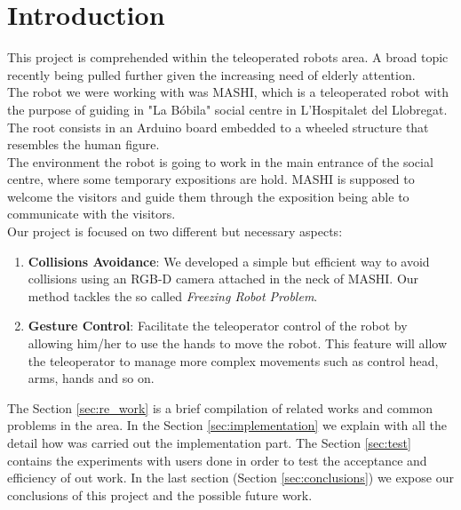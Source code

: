 \section{Introduction}
\label{sec:introduction}

This project is comprehended within the teleoperated robots area. A broad topic recently being pulled further given the increasing need of elderly attention.\\ 

The robot we were working with was MASHI, which is a teleoperated robot with the purpose of guiding in "La Bóbila" social centre in L'Hospitalet del Llobregat. The root consists in an Arduino board embedded to a wheeled structure that resembles the human figure.\\

The environment the robot is going to work in the main entrance of the social centre, where some temporary expositions are hold. MASHI is supposed to welcome the visitors and guide them through the exposition being able to communicate with the visitors.\\

Our project is focused on two different but necessary aspects:
\begin{enumerate}
	\item \textbf{Collisions Avoidance}: We developed a simple but efficient way to avoid collisions using an RGB-D camera attached in the neck of MASHI. Our method tackles the so called \emph{Freezing Robot Problem}.
	\item \textbf{Gesture Control}: Facilitate the teleoperator control of the robot by allowing him/her to use the hands to move the robot. This feature will allow the teleoperator to manage more complex movements such as control head, arms, hands and so on.
\end{enumerate}

The Section \ref{sec:re_work} is a brief compilation of related works and common problems in the area. In the Section \ref{sec:implementation} we explain with all the detail how was carried out the implementation part. The Section \ref{sec:test} contains the experiments with users done in order to test the acceptance and efficiency of out work. In the last section (Section \ref{sec:conclusions}) we expose our conclusions of this project and the possible future work.